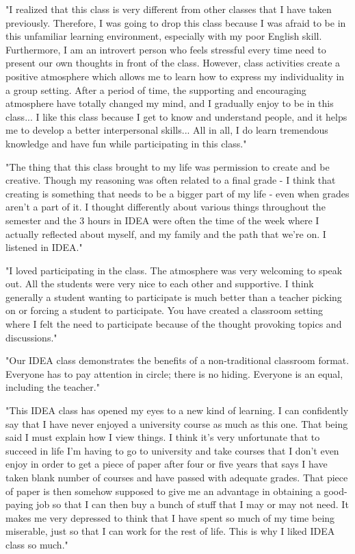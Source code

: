 \documentclass[letterpaper,10pt,headsepline]{scrreprt}
\begin{document}
"I realized that this class is very different from other classes that I have taken previously. Therefore, I was going to drop this class because I was afraid to be in this unfamiliar learning environment, especially with my poor English skill. Furthermore, I am an introvert person who feels stressful every time need to present our own thoughts in front of the class. However, class activities create a positive atmosphere which allows me to learn how to express my individuality in a group setting. After a period of time, the supporting and encouraging atmosphere have totally changed my mind, and I gradually enjoy to be in this class... I like this class because I get to know and understand people, and it helps me to develop a better interpersonal skills... All in all, I do learn tremendous knowledge and have fun while participating in this class."
\vspace{2em}

"The thing that this class brought to my life was permission to create and be creative. Though my reasoning was often related to a final grade - I think that creating is something that needs to be a bigger part of my life - even when grades aren't a part of it. I thought differently about various things throughout the semester and the 3 hours in IDEA were often the time of the week where I actually reflected about myself, and my family and the path that we're on. I listened in IDEA."
\vspace{2em}

"I loved participating in the class. The atmosphere was very welcoming to speak out. All the students were very nice to each other and supportive. I think generally a student wanting to participate is much better than a teacher picking on or forcing a student to participate. You have created a classroom setting where I felt the need to participate because of the thought provoking topics and discussions."
\vspace{2em}

"Our IDEA class demonstrates the benefits of a non-traditional classroom format. Everyone has to pay attention in circle; there is no hiding. Everyone is an equal, including the teacher."
\vspace{2em}

"This IDEA class has opened my eyes to a new kind of learning. I can confidently say that I have never enjoyed a university course as much as this one. That being said I must explain how I view things. I think it’s very unfortunate that to succeed in life I’m having to go to university and take courses that I don’t even enjoy in order to get a piece of paper after four or five years that says I have taken blank number of courses and have passed with adequate grades. That piece of paper is then somehow supposed to give me an advantage in obtaining a good-paying job so that I can then buy a bunch of stuff that I may or may not need. It makes me very depressed to think that I have spent so much of my time being miserable, just so that I can work for the rest of life. This is why I liked IDEA class so much."
\vspace{2em}
\end{document}
